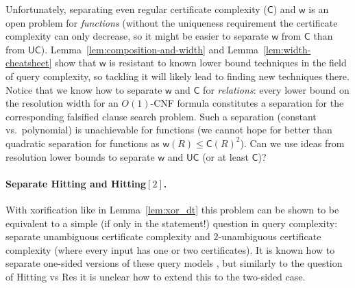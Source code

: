 \documentclass[11pt]{article}
\newcommand{\scterm}[1]{{\textrm{\sc #1}}}
\newcommand{\hit}{\scterm{Hitting}}
\newcommand{\res}{\scterm{Res}}
\newcommand{\hitp}{{\hit}$(\oplus)$}
\newcommand{\hitk}[1]{\hit$[#1]$}
\newcommand{\dagw}{\mathsf{w}}
\newcommand{\cert}{\mathsf{C}}
\newcommand{\ucert}{\mathsf{UC}}
\numberwithin{equation}{section}
\begin{document}
Unfortunately, separating even regular certificate complexity ($\cert$) and $\dagw$ is an open problem for \emph{functions} (without the uniqueness requirement the certificate complexity can only decrease, so it might be easier to separate $\dagw$ from $\cert$ than from $\ucert$). Lemma~\ref{lem:composition-and-width} and Lemma~\ref{lem:width-cheatsheet} show that $\dagw$ is resistant to known lower bound techniques in the field of query complexity, so tackling it will likely lead to finding new techniques there. Notice that we know how to separate $\dagw$ and $\cert$ for \emph{relations}: every lower bound on the resolution width for an $O(1)$-CNF formula constitutes a separation for the corresponding falsified clause search problem. Such a separation (constant vs.\ polynomial) is unachievable for functions (we cannot hope for better than quadratic separation for functions as $\dagw(R) \le \cert(R)^2$). Can we use ideas from resolution lower bounds to separate $\dagw$ and $\ucert$ (or at least $\cert$)? 


\paragraph{Separate {\hit} and {\hitk{2}}.} With xorification like in Lemma~\ref{lem:xor_dt} this problem can be shown to be equivalent to a simple (if only in the statement!) question in query complexity: separate unambiguous certificate complexity and $2$-unambiguous certificate complexity (where every input has one or two certificates). It is known how to separate one-sided versions of these query models \cite{GKY22}, but similarly to the question of {\hit} vs {\res} it is unclear how to extend this to the two-sided case. 

\end{document}
